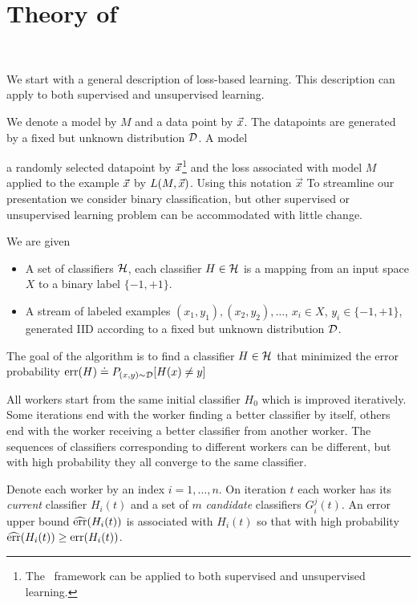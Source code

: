 \section{Theory of \tmsn}~\label{sec:theory}

We start with a general description of loss-based learning. This
description can apply to both supervised and unsupervised learning.

We denote a model by $M$ and a data point by $\vec{x}$. The datapoints are
generated by a fixed but unknown distribution ${\cal D}$. A model 


a randomly selected datapoint
by $\vec{x}$\footnote{The \tmsn\ framework can be applied to both
  supervised and unsupervised learning.} and the loss associated with
model $M$ applied to the example $\vec{x}$ by $L(M,\vec{x})$. Using this
notation 
$\vec{x}$ 
To streamline our presentation
we consider binary classification, but other supervised or
unsupervised learning problem can be accommodated with little change.

We are given
\newcommand{\cD}{{\cal D}}
\begin{itemize}
\item A set of classifiers ${\cal H}$, each classifier $H \in
  {\cal H}$ is a mapping from an input space $X$ to a binary label $\{-1,+1\}$.
\item A stream of labeled examples $(x_1,y_1),(x_2,y_2),\ldots$, $x_i
  \in X$, $y_i \in \{-1,+1\}$, generated IID according to a fixed but
  unknown distribution $\cD$.
\end{itemize}

The goal of the algorithm is to find a classifier $H \in
{\cal H}$ that minimized the error probability $\err(H)\doteq
P_{(x,y) \sim \cD}[H(x) \neq y]$

All workers start from the same initial classifier $H_0$ which is
improved iteratively. Some iterations end with the worker finding a
better classifier by itself, others end with the worker receiving a
better classifier from another worker. The sequences of classifiers
corresponding to different workers can be different, but with high
probability they all converge to the same classifier.

Denote each worker by an index $i=1,\ldots,n$. On iteration $t$
each worker has its {\em current} classifier  $H_i(t)$ and a set of $m$
{\em candidate} classifiers $G_i^j(t)$. An error upper bound
$\widehat{\mbox{err}}(H_i(t))$ is associated with $H_i(t)$ so that with high
probability $\widehat{\mbox{err}}(H_i(t)) \geq \mbox{err}(H_i(t))$.

